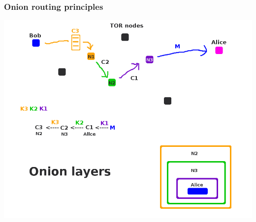 \begin{frame}
\begin{center}
\frametitle{Onion routing principles}
\includegraphics[width=0.8\linewidth]{./materials/Tor_principles_Naam}
\end{center}
\end{frame}


